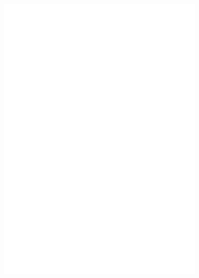     \begin{figure}
        \centering
        \begin{minipage}{0.75\linewidth}
            \centering
            \includegraphics[width=0.9\textwidth]{figs/sq40_671_0_6}
        \end{minipage}
        \label{fig:forty_sq_comp}
    \end{figure}
